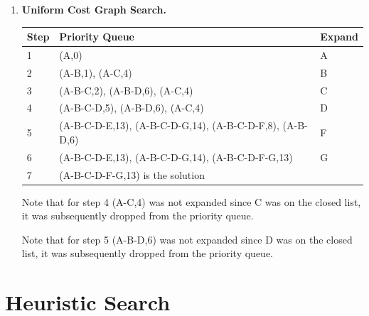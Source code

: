 \documentclass[11pt]{article}
\begin{document}
\begin{enumerate}
  \item {\bf  Uniform Cost Graph Search.} \\

    \begin{center}
    \begin{tabular}{|l|l@{\hspace*{1in}}|l|} \hline
    \bf Step & \bf Priority Queue & \bf Expand \\ \hline
    1 & (A,0) & A \\ \hline
    2 & (A-B,1), (A-C,4) & B \\ \hline
    3 & (A-B-C,2), (A-B-D,6), (A-C,4) & C \\ \hline
    4 & (A-B-C-D,5), (A-B-D,6), (A-C,4) & D \\ \hline
    5 & (A-B-C-D-E,13), (A-B-C-D-G,14), (A-B-C-D-F,8), (A-B-D,6) & F  \\ \hline
    6 & (A-B-C-D-E,13), (A-B-C-D-G,14), (A-B-C-D-F-G,13) & G \\ \hline
    7 & (A-B-C-D-F-G,13) is the solution &  \\ \hline
    \end{tabular}
    \end{center}

    Note that for step 4 (A-C,4) was not expanded since C was on the closed list, it was subsequently dropped from the priority queue.

    Note that for step 5 (A-B-D,6) was not expanded since D was on the closed list, it was subsequently dropped from the priority queue.

\end{enumerate}

\clearpage

\section{Heuristic Search}
\end{document}
